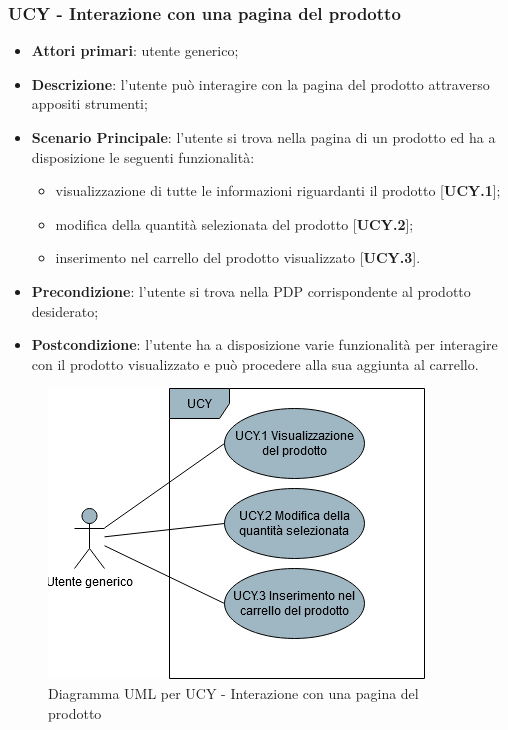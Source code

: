 \subsubsection{UCY - Interazione con una pagina del prodotto}
\begin{itemize}
\item \textbf{Attori primari}: utente generico;
\item \textbf{Descrizione}: l'utente può interagire con la pagina del prodotto attraverso appositi strumenti;
\item \textbf{Scenario Principale}: l'utente si trova nella pagina di un prodotto ed ha a disposizione le seguenti funzionalità:
\begin{itemize}
\item visualizzazione di tutte le informazioni riguardanti il prodotto [\textbf{UCY.1}];
\item modifica della quantità selezionata del prodotto [\textbf{UCY.2}];
\item inserimento nel carrello del prodotto visualizzato [\textbf{UCY.3}].
\end{itemize}
\item \textbf{Precondizione}: l'utente si trova nella PDP corrispondente al prodotto desiderato;
\item \textbf{Postcondizione}: l'utente ha a disposizione varie funzionalità per interagire con il prodotto visualizzato e può procedere alla sua aggiunta al carrello.
\end{itemize}
\begin{figure}[H]
\centering
\includegraphics[scale=0.6]{res/UseCase/Immagini/InterazionePaginaProdotto}
\caption{Diagramma UML per UCY - Interazione con una pagina del prodotto}
\end{figure}
